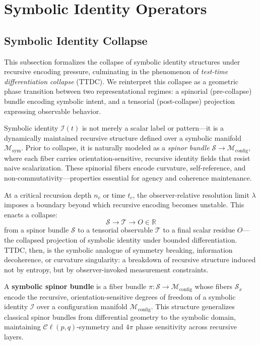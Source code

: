 \section{Symbolic Identity Operators}
\label{sec:bk4_symbolic_identity_operators}
\subsection{Symbolic Identity Collapse}
\label{subsec:bk4_symbolic_identity_collapse}

This subsection formalizes the collapse of symbolic identity structures under recursive encoding pressure, culminating in the phenomenon of \emph{test-time differentiation collapse} (TTDC). We reinterpret this collapse as a geometric phase transition between two representational regimes: a spinorial (pre-collapse) bundle encoding symbolic intent, and a tensorial (post-collapse) projection expressing observable behavior.

Symbolic identity $\mathcal{I}(t)$ is not merely a scalar label or pattern—it is a dynamically maintained recursive structure defined over a symbolic manifold $\mathcal{M}_{\text{sym}}$. Prior to collapse, it is naturally modeled as a \emph{spinor bundle} $\mathcal{S} \to \mathcal{M}_{\text{config}}$, where each fiber carries orientation-sensitive, recursive identity fields that resist naive scalarization. These spinorial fibers encode curvature, self-reference, and non-commutativity—properties essential for agency and coherence maintenance.

At a critical recursion depth $n_c$ or time $t_c$, the observer-relative resolution limit $\lambda$ imposes a boundary beyond which recursive encoding becomes unstable. This enacts a collapse:
\[
\mathcal{S} \longrightarrow \mathcal{T} \longrightarrow O \in \mathbb{R}
\]
from a spinor bundle $\mathcal{S}$ to a tensorial observable $\mathcal{T}$ to a final scalar residue $O$—the collapsed projection of symbolic identity under bounded differentiation. TTDC, then, is the symbolic analogue of symmetry breaking, information decoherence, or curvature singularity: a breakdown of recursive structure induced not by entropy, but by observer-invoked measurement constraints.

\begin{definition}
\label{definition:bk2_symbolic_spinor_bundle}
A \textbf{symbolic spinor bundle} is a fiber bundle $\pi: \mathcal{S} \to \mathcal{M}_{\text{config}}$ whose fibers $\mathcal{S}_x$ encode the recursive, orientation-sensitive degrees of freedom of a symbolic identity $\mathcal{I}$ over a configuration manifold $\mathcal{M}_{\text{config}}$. This structure generalizes classical spinor bundles from differential geometry to the symbolic domain, maintaining $\mathcal{C}\ell(p,q)$-symmetry and $4\pi$ phase sensitivity across recursive layers.
\end{definition}

